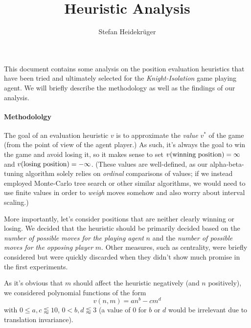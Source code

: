 \documentclass{article}
\title{Heuristic Analysis}
\author{Stefan Heidekrüger}
\theoremstyle{plain}
\theoremstyle{definition}
\theoremstyle{remark}
\begin{document}
\maketitle

This document contains some analysis on the position evaluation heuristics that have been tried and ultimately selected for the \emph{Knight-Isolation} game playing agent. We will briefly describe the methodology as well as the findings of our analysis.

\paragraph{Methodololgy}
The goal of an evaluation heuristic $v$ is to approximate the \emph{value} $v^*$ of the game (from the point of view of the agent player.) As such, it's always the goal to win the game and avoid losing it, so it makes sense to set $v(\textnormal{winning position}) = \infty$ and $v(\textnormal{losing position})=-\infty$. (These values are well-defined, as our alpha-beta-tuning algorithm solely relies on \emph{ordinal} comparisons of values; if we instead employed Monte-Carlo tree search or other similar algorithms, we would need to use finite values in order to \emph{weigh} moves somehow \textemdash and also worry about interval scaling.)

More importantly, let's consider positions that are neither clearly winning or losing. We decided that the heuristic should be primarily decided based on the \emph{number of possible moves for the playing agent} $n$ and the \emph{number of possible moves for the opposing player} $m$. Other measures, such as centrality, were briefly considered but were quickly discarded when they didn't show much promise in the first experiments.

As it's obvious that $m$ should affect the heuristic negatively (and $n$ positively), we considered polynomial functions of the form
$$v(n,m) = an^b - cm^d $$
with $0 \leq a,c \lessapprox 10$, $0 < b,d \lessapprox 3$ (a value of $0$ for $b$ or $d$ would be irrelevant due to translation invariance).

\lstset{
basicstyle=\scriptsize\tt,
}

\label{listing}
\end{document}
